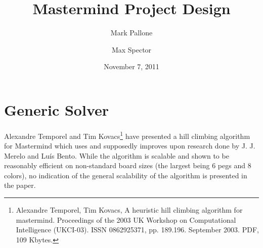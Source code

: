 \documentclass[11pt,twocolumn]{article}
\newcommand{\HRule}{\rule{\linewidth}{0.5mm}}
\begin{document}
\title{Mastermind Project Design}
\date{November 7, 2011}
\author{Mark Pallone \and Max Spector}

\maketitle










\section{Generic Solver}

Alexandre Temporel and Tim Kovacs\footnote{Alexandre Temporel, Tim Kovacs, A heuristic hill climbing algorithm for mastermind. Proceedings of the 2003 UK Workshop on Computational Intelligence (UKCI-03). ISSN 0862925371, pp. 189.196. September 2003. PDF, 109 Kbytes.} have presented a hill climbing algorithm for Mastermind which uses and supposedly improves upon research done by J. J. Merelo and Lu\'{i}s Bento. While the algorithm is scalable and shown to be reasonably efficient on non-standard board sizes (the largest being 6 pegs and 8 colors), no indication of the general scalability of the algorithm is presented in the paper.
\end{document}
